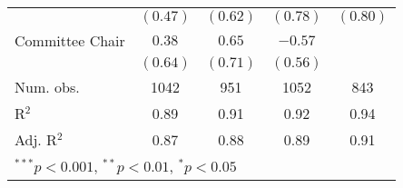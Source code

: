 \documentclass[12pt]{article}
\begin{document}
\begin{table}[H]
\begin{center}
\begin{tabular}{l c c c c }
			& $(0.47)$     & $(0.62)$      & $(0.78)$      & $(0.80)$     \\
			Committee Chair                   & $0.38$       & $0.65$        & $-0.57$       &              \\
			& $(0.64)$     & $(0.71)$      & $(0.56)$      &              \\
			\hline
			Num. obs.               & 1042         & 951           & 1052          & 843          \\
			R$^2$      & 0.89         & 0.91          & 0.92          & 0.94         \\
			Adj. R$^2$ & 0.87         & 0.88          & 0.89          & 0.91         \\
			\hline
			\multicolumn{5}{l}{\scriptsize{$^{***}p<0.001$, $^{**}p<0.01$, $^*p<0.05$}}
		\end{tabular}
	\end{center}
\end{table}
\end{document}
